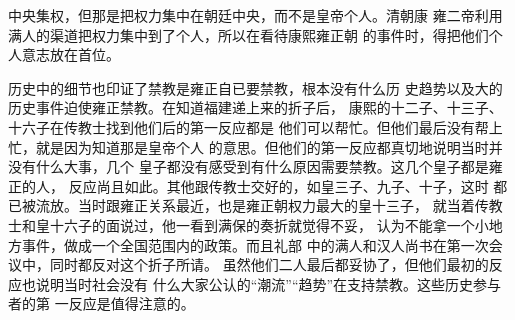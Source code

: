 中央集权，但那是把权力集中在朝廷中央，而不是皇帝个人。清朝康%
雍二帝利用满人的渠道把权力集中到了个人，所以在看待康熙雍正朝%
的事件时，得把他们个人意志放在首位。%
\par
历史中的细节也印证了禁教是雍正自已要禁教，根本没有什么历%
史趋势以及大的历史事件迫使雍正禁教。在知道福建递上来的折子后，%
康熙的十二子、十三子、十六子在传教士找到他们后的第一反应都是%
他们可以帮忙。但他们最后没有帮上忙，就是因为知道那是皇帝个人%
的意思。但他们的第一反应都真切地说明当时并没有什么大事，几个%
皇子都没有感受到有什么原因需要禁教。这几个皇子都是雍正的人，%
反应尚且如此。其他跟传教士交好的，如皇三子、九子、十子，这时%
都已被流放。当时跟雍正关系最近，也是雍正朝权力最大的皇十三子，%
就当着传教士和皇十六子的面说过，他一看到满保的奏折就觉得不妥，%
认为不能拿一个小地方事件，做成一个全国范围内的政策。而且礼部%
中的满人和汉人尚书在第一次会议中，同时都反对这个折子所请。%
虽然他们二人最后都妥协了，但他们最初的反应也说明当时社会没有%
什么大家公认的“潮流”“趋势”在支持禁教。这些历史参与者的第%
一反应是值得注意的。%
